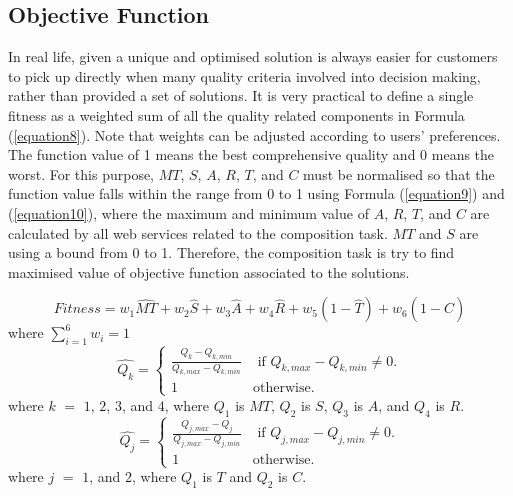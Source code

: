 \documentclass{llncs}
\begin{document}
\subsection{Objective Function}
In real life, given a unique and optimised solution is always easier for customers to pick up directly when many quality criteria involved into decision making, rather than provided a set of solutions. It is very practical to define a single fitness as a weighted sum of all the quality related components in Formula (\ref{equation8}). Note that weights can be adjusted according to users' preferences. The function value of 1 means the best comprehensive quality and 0 means the worst. For this purpose, $MT$, $S$, $A$, $R$, $T$, and $C$ must be normalised so that the function value falls within the range from 0 to 1 using Formula (\ref{equation9}) and (\ref{equation10}), where the maximum and minimum value of $A$, $R$, $T$, and $C$ are calculated by all web services related to the composition task. $MT$ and $S$ are using a bound from 0 to 1. Therefore, the composition task is try to find maximised value of objective function associated to the solutions.

\vspace{-0.2cm}
\begin{equation}
\label{equation8}
Fitness = w_1 \hat{MT} + w_2 \hat{S} + w_3 \hat{A} + w_4 \hat{R} + w_5(1 - \hat{T}) + w_6(1 - \hat{C})
\end{equation}
\noindent where $\sum_{i=1}^{6} w_i = 1$
\\
\vspace{-0.2cm}
\begin{equation}
\label{equation9}
\hat{Q_k} = 
\begin{cases}
	\frac{Q_k - Q_{k, min}}{Q_{k, max} - Q_{k, min}} & \text{ if }Q_{k, max} - Q_{k, min} \neq 0.\\
	1 & \mathrm{ otherwise}.
\end{cases}
\end{equation}
\noindent where $k$ $=$ $1$, $2$, $3$, and $4$, where $Q_1$ is $MT$, $Q_2$ is $S$, $Q_3$ is $A$, and $Q_4$ is $R$.
\begin{equation}
\label{equation10}
\hat{Q_j} = 
\begin{cases}
	\frac{Q_{j,max} - Q_j}{Q_{j, max} - Q_{j, min}} & \text{ if }Q_{j, max} - Q_{j, min} \neq 0.\\
	1 & \mathrm{ otherwise}.
\end{cases}
\end{equation}
\noindent where $j$ $=$ $1$, and $2$, where $Q_1$ is $T$ and $Q_2$ is $C$.
\end{document}
